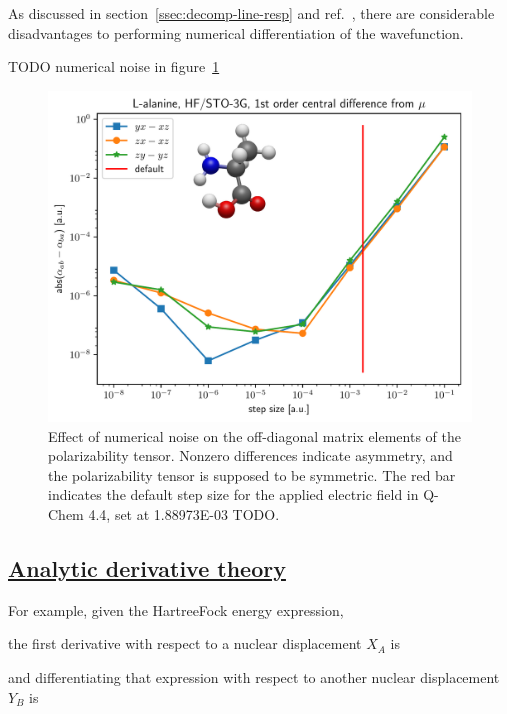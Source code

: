 \documentclass[%
class = book,%
crop = false,%
float = true,%
multi = true,%
preview = false,%
]{standalone}
\newcommand\hf{Hartree\textendash{}Fock\xspace}%
\begin{document}
As discussed in section~\ref{ssec:decomp-line-resp} and ref.~\parencite{gauss2000}, there are considerable disadvantages to performing numerical differentiation of the wavefunction.

TODO numerical noise in figure~\ref{fig:finite-difference-numerical-noise}

\begin{figure}
  \centering
  \includegraphics[width=\textwidth]{./diff_overlay.pdf}
  \caption[Asymmetry in the 1st-order finite-difference polarizability]{Effect of numerical noise on the off-diagonal matrix elements of the polarizability tensor. Nonzero differences indicate asymmetry, and the polarizability tensor is supposed to be symmetric. The red bar indicates the default step size for the applied electric field in Q-Chem 4.4, set at \SI{1.88973E-03}{\au} TODO.}
  \label{fig:finite-difference-numerical-noise}
\end{figure}

\subsection{\texorpdfstring{\href{https://chemistry.stackexchange.com/q/89831/194}{Analytic derivative theory}}{Analytic derivative theory}}
\label{ssec:analytic-derivative-theory}

For example, given the \hf energy expression,

the first derivative with respect to a nuclear displacement \(X_{A}\) is

and differentiating that expression with respect to another nuclear displacement \(Y_{B}\) is
\end{document}
